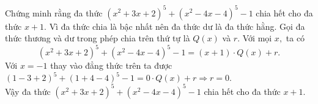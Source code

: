 		\begin{vn}  %
			Chứng minh rằng đa thức $(x^2+3x+2)^5+(x^2-4x-4)^5-1$ chia hết cho đa thức $x+1.$
			\loigiai
			{
				Vì đa thức chia là bậc nhất nên đa thức dư là đa thức hằng. Gọi đa thức thương và dư trong phép chia trên thứ tự là $Q(x)$ và $r.$ Với mọi $x,$ ta có 
				\[(x^2+3x+2)^5+(x^2-4x-4)^5-1=(x+1)\cdot Q(x)+r.\]
				Với $x=-1$ thay vào đẳng thức trên ta được $(1-3+2)^5+(1+4-4)^5-1=0\cdot Q(x)+r\Rightarrow r=0.$\\
				Vậy đa thức $(x^2+3x+2)^5+(x^2-4x-4)^5-1$ chia hết cho đa thức $x+1.$
			}
		\end{vn}

